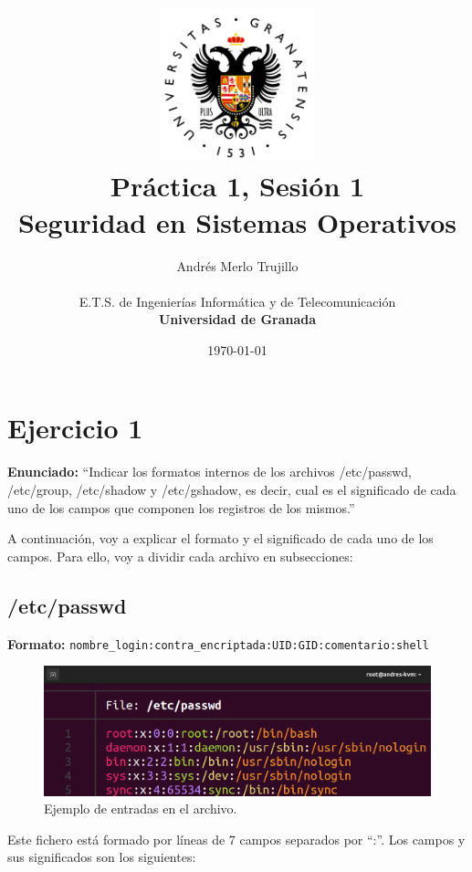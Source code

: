 \documentclass{article}
\title{
\includegraphics[width=1.75in]{imagenes/UGR-Logo.png} \\
\vspace*{1in}
\textbf{Práctica 1, Sesión 1} \\
Seguridad en Sistemas Operativos \\
\vspace*{0.5in}}
\author{Andrés Merlo Trujillo \\
\vspace*{0.5in} \\
E.T.S. de Ingenierías Informática y de Telecomunicación \\
\textbf{Universidad de Granada}} \date{\today}
\begin{document}
\begin{titlingpage}
    \maketitle
\end{titlingpage}

\tableofcontents

\newpage

\pagestyle{fancy}

\section{Ejercicio 1}

\textbf{Enunciado: }``Indicar los formatos internos de los archivos /etc/passwd, /etc/group, /etc/shadow y /etc/gshadow, es decir, cual es el significado de cada uno de los campos que componen los registros de los mismos.''

\bigskip

A continuación, voy a explicar el formato y el significado de cada uno de los campos. Para ello, voy a dividir cada archivo en subsecciones:

\subsection{/etc/passwd}
\textbf{Formato:} \verb|nombre_login:contra_encriptada:UID:GID:comentario:shell|

\begin{figure}[H]
    \includegraphics[width=\textwidth]{imagenes/passwdfile.png}
    \caption{Ejemplo de entradas en el archivo.}
\end{figure}

\bigskip

Este fichero está formado por líneas de 7 campos separados por ``:''. Los campos y sus significados son los siguientes:
\end{document}
